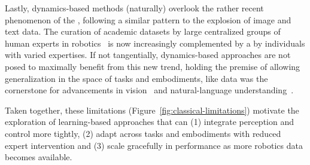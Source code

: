 Lastly, dynamics-based methods (naturally) overlook the rather recent phenomenon of the , following a similar pattern to the explosion of image and text data.
The curation of academic datasets by large centralized groups of human experts in robotics~\citep{OpenXEmbodimentRobotic,DROIDLargeScaleIntheWild,agibot-world-contributorsAgiBotWorldColosseo2025} is now increasingly complemented by a  by individuals with varied expertises.
If not tangentially, dynamics-based approaches are not posed to maximally benefit from this new trend, holding the premise of allowing generalization in the space of tasks and embodiments, like data was the cornerstone for advancements in vision~\citep{alayracFlamingoVisualLanguage2022} and natural-language understanding~\citep{openaiGPT4TechnicalReport2024}.

Taken together, these limitations (Figure~\ref{fig:classical-limitations}) motivate the exploration of learning-based approaches that can (1) integrate perception and control more tightly, (2) adapt across tasks and embodiments with reduced expert intervention and (3) scale gracefully in performance as more robotics data becomes available.
